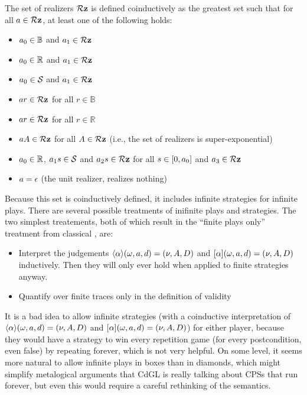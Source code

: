 \documentclass[12pt]{cmuthesis}
\theoremstyle{definition}
\theoremstyle{remark}
\newcommand{\allstate}{\mathcal{S}}
\newcommand{\CdGL}{\textsf{CdGL}\xspace}
\begin{document}
The set of realizers $\allRz$ is defined coinductively as the greatest set such that for all $\aa \in \allRz$, at least one of the following holds:
\begin{itemize}
\item $\rzFst{\aa} \in \mathbb{B}$ and $\rzSnd{\aa} \in \allRz$
\item $\rzFst{\aa} \in \mathbb{R}$ and $\rzSnd{\aa} \in \allRz$
\item $\rzFst{\aa} \in \allstate$ and $\rzSnd{\aa} \in \allRz$
\item $\rzApp{\aa}{r} \in \allRz$ for all $r \in \mathbb{B}$
\item $\rzApp{\aa}{r} \in \allRz$ for all $r \in \mathbb{R}$
\item $\rzApp{\aa}{\ab} \in \allRz$ for all $\ab \in \allRz$ (i.e., the set of realizers is super-exponential)
\item $\rzFst{\aa} \in \mathbb{R}$, $\rzApp{\rzSnd{\aa}}{s} \in \allstate$ and $\rzApp{\rzThd{\aa}}{s} \in \allRz$ for all $s \in [0,\rzFst{\aa}]$ and $\rzFrt{\aa}\in\allRz$
\item $\aa = \epsilon$ (the unit realizer, realizes nothing)
\end{itemize}
Because this set is coinductively defined, it includes infinite strategies for infinite plays.
There are several possible treatments of inifinite plays and strategies.
The two simplest treatements, both of which result in the ``finite plays only'' treatment from classical \dGL, are:
\begin{itemize}
\item 
 Interpret the judgements $\rzA{\sa,\aa,\da}{\alpha}{\sb,\ab,\db}$ and $\rzD{\sa,\aa,\da}{\alpha}{\sb,\ab,\db}$ inductively.
 Then they will only ever hold when applied to finite strategies anyway.
\item Quantify over finite traces only in the definition of validity
\end{itemize}
It is a bad idea to allow infinite strategies (with a coinductive interpretation of $\rzA{\sa,\aa,\da}{\alpha}{\sb,\ab,\db}$ and $\rzD{\sa,\aa,\da}{\alpha}{\sb,\ab,\db}$) for either player, 
because they would have a strategy to win every repetition game (for every postcondition, even false) by repeating forever, which is not very helpful.
On some level, it seems more natural to allow infinite plays in boxes than in diamonds, which might simplify metalogical arguments that \CdGL is really talking about CPSs that run forever, but even this would require a careful rethinking of the semantics.
\end{document}

